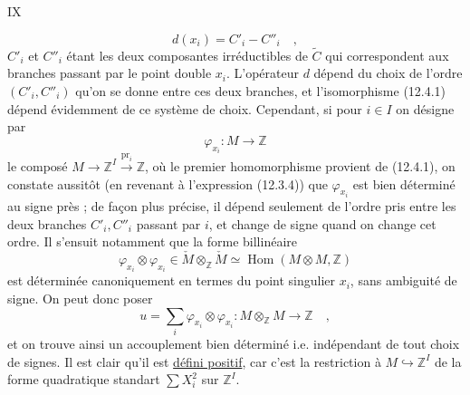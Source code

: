 \hfill IX

\[
 d(x_i)=C'_i-C''_i\quad,\tag*{(12.4.2)}
\]
$C'_i$ et $C''_i$ étant les deux composantes irréductibles de $\widetilde C$ qui correspondent aux branches passant par le point double $x_i$. L'opérateur $d$ dépend du choix de l'ordre $(C'_i,C''_i)$ qu'on se donne entre ces deux branches, et l'isomorphisme (12.4.1) dépend évidemment de ce système de choix. Cependant, si pour $i\in I$ on désigne par
\[
 \varphi_{x_i}:M\longrightarrow\mathbb Z\tag*{(12.4.3)}
\]
le composé $M\longrightarrow\mathbb Z^I\xrightarrow{\mathrm{pr}_i}\mathbb Z$, où le premier homomorphisme provient de (12.4.1), on constate aussitôt (en revenant à l'expression (12.3.4)) que $\varphi_{x_i}$ est bien déterminé au signe près ; de façon plus précise, il dépend seulement de l'ordre pris entre les deux branches $C'_i,C''_i$ passant par $i$, et change de signe quand on change cet ordre. Il s'ensuit notamment que la forme billinéaire
\[
 \varphi_{x_i}\otimes\varphi_{x_i}\in\check M\otimes_{\mathbb Z}\check M\simeq\operatorname{Hom}(M\otimes M,\mathbb Z)
 \tag*{(12.4.4)}
\]
est déterminée canoniquement en termes du point singulier $x_i$, sans ambiguité de signe. On peut donc poser
\[
 u=\sum_i\varphi_{x_i}\otimes\varphi_{x_i}:M\otimes_{\mathbb Z}M\longrightarrow\mathbb Z\quad,
 \tag*{(12.4.5)}
\]
et on trouve ainsi un accouplement bien déterminé i.e. indépendant de tout choix de signes. Il est clair qu'il est \uline{défini positif}, car c'est la restriction à $M\hookrightarrow\mathbb Z^I$ de la forme quadratique standart $\sum X_i^2$ sur $\mathbb Z^I$.
